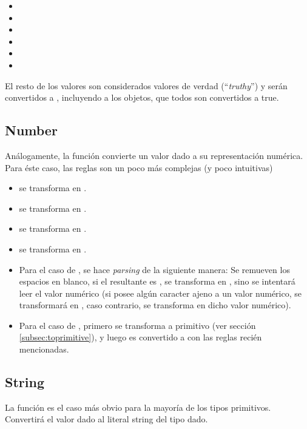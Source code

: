 \begin{itemize}
\item {}
\item {}
\item {}
\item {}
\item {}
\item {}
\end{itemize}

El resto de los valores son considerados valores de verdad ("`\textit{truthy}"') y serán convertidos a , incluyendo a los objetos, que todos son convertidos a true.

\subsection{Number}

Análogamente, la función  convierte un valor dado a su representación numérica. Para éste caso, las reglas son un poco más complejas (y poco intuitivas)

\begin{itemize}
\item {} se transforma en .
\item {} se transforma en .
\item {} se transforma en .
\item {} se transforma en .
\item Para el caso de , se hace \textit{parsing} de la siguiente manera: Se remueven los espacios en blanco, si el  resultante es , se transforma en , sino se intentará leer el valor numérico (si posee algún caracter ajeno a un valor numérico, se transformará en , caso contrario, se transforma en dicho valor numérico).
\item Para el caso de , primero se transforma a primitivo (ver sección \ref{subsec:toprimitive}), y luego es convertido a  con las reglas recién mencionadas.
\end{itemize}

\subsection{String}

La función  es el caso más obvio para la mayoría de los tipos primitivos. Convertirá el valor dado al literal string del tipo dado.

